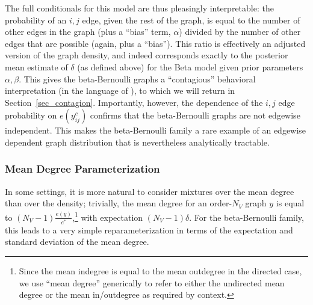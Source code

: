 \documentclass[11pt]{article}
\begin{document}
The full conditionals for this model are thus pleasingly interpretable: the probability of an $i,j$ edge, given the rest of the graph, is equal to the number of other edges in the graph (plus a ``bias'' term, $\alpha$) divided by the number of other edges that are possible (again, plus a ``bias'').  This ratio is effectively an adjusted version of the graph density, and indeed corresponds exactly to the posterior mean estimate of $\delta$ (as defined above) for the Beta model given prior parameters $\alpha,\beta$.  This gives the beta-Bernoulli graphs a ``contagious'' behavioral interpretation (in the language of \citet{coleman:bk:1964}), to which we will return in Section~\ref{sec_contagion}.  Importantly, however, the dependence of the $i,j$ edge probability on $e(y^c_{ij})$ confirms that the beta-Bernoulli graphs are not edgewise independent.  This makes the beta-Bernoulli family a rare example of an edgewise dependent graph distribution that is nevertheless analytically tractable. 

\subsubsection{Mean Degree Parameterization} \label{sec_den_meandeg}

In some settings, it is more natural to consider mixtures over the mean degree than over the density; trivially, the mean degree for an order-$N_V$ graph $y$ is equal to $(N_V-1)\tfrac{e(y)}{e^*}$,\footnote{Since the mean indegree is equal to the mean outdegree in the directed case, we use ``mean degree'' generically to refer to either the undirected mean degree or the mean in/outdegree as required by context.} with expectation $(N_V-1)\delta$.  For the beta-Bernoulli family, this leads to a very simple reparameterization in terms of the expectation and standard deviation of the mean degree.
\end{document}
